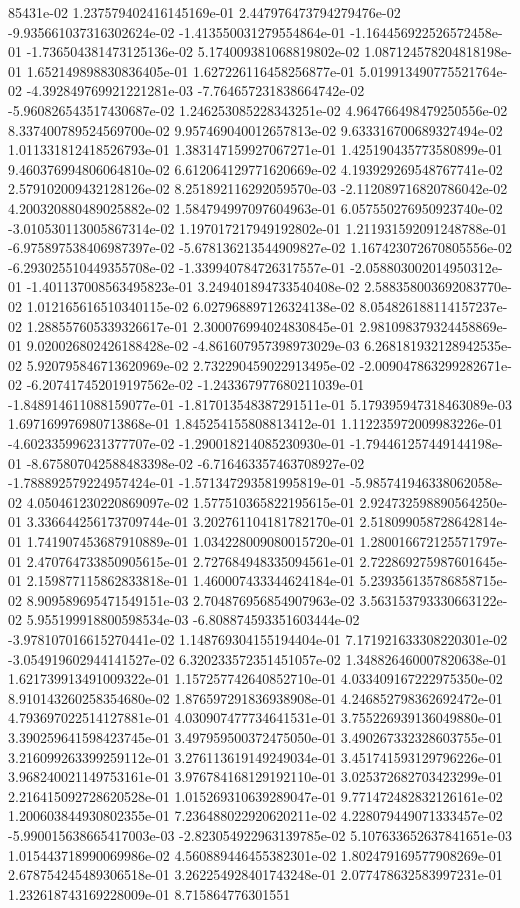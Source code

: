 85431e-02	1.237579402416145169e-01	2.447976473794279476e-02	-9.935661037316302624e-02	-1.413550031279554864e-01	-1.164456922526572458e-01	-1.736504381473125136e-02	5.174009381068819802e-02	1.087124578204818198e-01	1.652149898830836405e-01	1.627226116458256877e-01	5.019913490775521764e-02	-4.392849769921221281e-03	-7.764657231838664742e-02	-5.960826543517430687e-02	1.246253085228343251e-02	4.964766498479250556e-02	8.337400789524569700e-02	9.957469040012657813e-02	9.633316700689327494e-02	1.011331812418526793e-01	1.383147159927067271e-01	1.425190435773580899e-01	9.460376994806064810e-02	6.612064129771620669e-02	4.193929269548767741e-02	2.579102009432128126e-02	8.251892116292059570e-03	-2.112089716820786042e-02	4.200320880489025882e-02	1.584794997097604963e-01	6.057550276950923740e-02	-3.010530113005867314e-02	1.197017217949192802e-01	1.211931592091248788e-01	-6.975897538406987397e-02	-5.678136213544909827e-02	1.167423072670805556e-02	-6.293025510449355708e-02	-1.339940784726317557e-01	-2.058803002014950312e-01	-1.401137008563495823e-01	3.249401894733540408e-02	2.588358003692083770e-02	1.012165616510340115e-02	6.027968897126324138e-02	8.054826188114157237e-02	1.288557605339326617e-01	2.300076994024830845e-01	2.981098379324458869e-01	9.020026802426188428e-02	-4.861607957398973029e-03	6.268181932128942535e-02	5.920795846713620969e-02	2.732290459022913495e-02	-2.009047863299282671e-02	-6.207417452019197562e-02	-1.243367977680211039e-01	-1.848914611088159077e-01	-1.817013548387291511e-01	5.179395947318463089e-03	1.697169976980713868e-01	1.845254155808813412e-01	1.112235972009983226e-01	-4.602335996231377707e-02	-1.290018214085230930e-01	-1.794461257449144198e-01	-8.675807042588483398e-02	-6.716463357463708927e-02	-1.788892579224957424e-01	-1.571347293581995819e-01	-5.985741946338062058e-02	4.050461230220869097e-02	1.577510365822195615e-01	2.924732598890564250e-01	3.336644256173709744e-01	3.202761104181782170e-01	2.518099058728642814e-01	1.741907453687910889e-01	1.034228009080015720e-01	1.280016672125571797e-01	2.470764733850905615e-01	2.727684948335094561e-01	2.722869275987601645e-01	2.159877115862833818e-01	1.460007433344624184e-01	5.239356135786858715e-02	8.909589695471549151e-03	2.704876956854907963e-02	3.563153793330663122e-02	5.955199918800598534e-03	-6.808874593351603444e-02	-3.978107016615270441e-02	1.148769304155194404e-01	7.171921633308220301e-02	-3.054919602944141527e-02	6.320233572351451057e-02	1.348826460007820638e-01	1.621739913491009322e-01	1.157257742640852710e-01	4.033409167222975350e-02	8.910143260258354680e-02	1.876597291836938908e-01	4.246852798362692472e-01	4.793697022514127881e-01	4.030907477734641531e-01	3.755226939136049880e-01	3.390259641598423745e-01	3.497959500372475050e-01	3.490267332328603755e-01	3.216099263399259112e-01	3.276113619149249034e-01	3.451741593129796226e-01	3.968240021149753161e-01	3.976784168129192110e-01	3.025372682703423299e-01	2.216415092728620528e-01	1.015269310639289047e-01	9.771472482832126161e-02	1.200603844930802355e-01	7.236488022920620211e-02	4.228079449071333457e-02	-5.990015638665417003e-03	-2.823054922963139785e-02	5.107633652637841651e-03	1.015443718990069986e-02	4.560889446455382301e-02	1.802479169577908269e-01	2.678754245489306518e-01	3.262254928401743248e-01	2.077478632583997231e-01	1.232618743169228009e-01	8.715864776301551